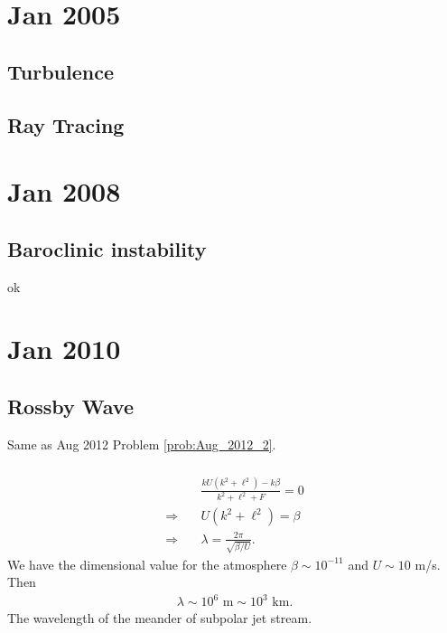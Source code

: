 \documentclass[11pt,letterpaper]{book}
\theoremstyle{definition}
\newcommand{\thus}{\Rightarrow \quad }
\begin{document}
\chapter{Jan 2005}
\section{Turbulence}

\section{Ray Tracing}


\chapter{Jan 2008}
\section{Baroclinic instability}
ok


\chapter{Jan 2010}
\section{Rossby Wave}
Same as Aug 2012 Problem \ref{prob:Aug_2012_2}.
\subsection{}

\subsection{}

\subsection{}
\begin{align*}
&\frac{kU(k^2+\ell^2)-k\beta}{k^2+\ell^2+F} = 0\\
\thus &U(k^2+\ell^2) = \beta\\
\thus &\lambda = \frac{2\pi}{\sqrt{{\beta}/{U}}}.
\end{align*}
We have the dimensional value for the atmosphere $\beta \sim 10^{-11}$ and $U\sim 10$ m/s. Then
\begin{align*}
\lambda\sim 10^6\text{ m}\sim 10^3\text{ km}.
\end{align*}
The wavelength of the meander of subpolar jet stream.
\end{document}
